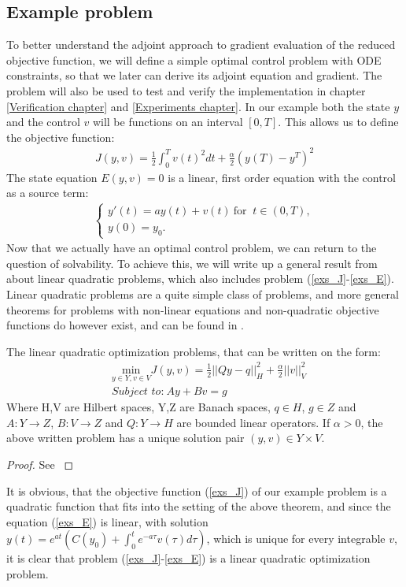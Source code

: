 \subsection{Example problem} \label{example_sec}
To better understand the adjoint approach to gradient evaluation of the reduced objective function, we will define a simple optimal control problem with ODE constraints, so that we later can derive its adjoint equation and gradient. The problem will also be used to test and verify the implementation in chapter \ref{Verification chapter} and \ref{Experiments chapter}. In our example both the state $y$ and the control $v$ will be functions on an interval $[0,T]$. This allows us to define the objective function:
\begin{align}
J(y,v) = \frac{1}{2}\int_0^Tv(t)^2dt + \frac{\alpha}{2}(y(T)-y^T)^2 \label{exs_J}
\end{align}
The state equation $E(y,v)=0$ is a linear, first order equation with the control as a source term:
\begin{align}
\left\{
     \begin{array}{lr}
       	y'(t)=ay(t) + v(t) \ \textrm{for } \ t\in(0,T),\\
       	y(0)=y_0.
     \end{array}
   \right. \label{exs_E}
\end{align}
Now that we actually have an optimal control problem, we can return to the question of solvability. To achieve this, we will write up a general result from \cite{hinze2008optimization} about linear quadratic problems, which also includes problem (\ref{exs_J}-\ref{exs_E}). Linear quadratic problems are a quite simple class of problems, and more general theorems for problems with non-linear equations and non-quadratic objective functions do however exist, and can be found in \cite{hinze2008optimization}.
\begin{theorem}
The linear quadratic optimization problems, that can be written on the form:
\begin{align*}
&\underset{y\in Y,v\in V}{\text{min}}J(y,v) = \frac{1}{2}||Qy-q||_H^2 + \frac{\alpha}{2}||v||_V^2 \\
&\textit{Subject to:} \ Ay + Bv = g
\end{align*}
Where H,V are Hilbert spaces, Y,Z are Banach spaces, $q\in H$, $g\in Z$ and $A:Y\rightarrow Z$, $B:V\rightarrow Z$ and $Q:Y\rightarrow H$ are bounded linear operators. If $\alpha>0$, the above written problem has a unique solution pair $(y,v)\in Y\times V$.
\end{theorem}   
\begin{proof}
See \cite{hinze2008optimization}
\end{proof}
It is obvious, that the objective function (\ref{exs_J}) of our example problem is a quadratic function that fits into the setting of the above theorem, and since the equation (\ref{exs_E}) is linear, with solution $y(t) = e^{a t}(C(y_0)+\int_0^te^{-a\tau}v(\tau)d\tau)$, which is unique for every integrable $v$, it is clear that problem (\ref{exs_J}-\ref{exs_E}) is a linear quadratic optimization problem. 
